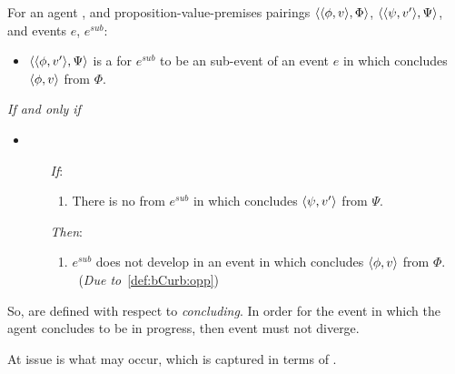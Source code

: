 \begin{note}
  \begin{definition}[A \bCurb{0}]
    \label{def:bCurb}
    For an agent \vAgent{}, and proposition-value-premises pairings \(\langle \langle \phi, v \rangle, \Phi \rangle\), \(\langle \langle \psi, v' \rangle, \Psi \rangle\), and events \(e\), \(e^{sub}\):

    \begin{itemize}
    \item
      \(\langle \langle \phi, v' \rangle, \Psi \rangle\) is a \emph{\bCurb{}} for \(e^{sub}\) to be an sub-event of an event \(e\) in which \vAgent{} concludes \(\langle \phi, v \rangle\) from \(\Phi\).
    \end{itemize}

    \emph{If and only if}

    \begin{itemize}
    \item
        \begin{enumerate}
        \item[\emph{If}:]
          \begin{enumerate}[label=\alph*., ref=(\alph*)]
          \item
            \label{def:bCurb:opp}
            There is no \pevent{} from \(e^{sub}\) in which \vAgent{} concludes \(\langle \psi, v' \rangle\) from \(\Psi\).
          \end{enumerate}
        \item[\emph{Then}:]
          \begin{enumerate}[label=\alph*., ref=(\alph*), resume]
          \item
            \label{def:bCurb:fail}
            \(e^{sub}\) does not develop in an event in which \vAgent{} concludes \(\langle \phi, v \rangle\) from \(\Phi\).\newline
            \mbox{ }\hfill(\emph{Due to}~\ref{def:bCurb:opp})
          \end{enumerate}
      \end{enumerate}
    \end{itemize}
    \vspace{-\baselineskip}
  \end{definition}

  So,  are defined with respect to \emph{concluding}.
  In order for the event in which the agent concludes to be in progress, then event must not diverge.

  At issue is what may occur, which is captured in terms of .
\end{note}

